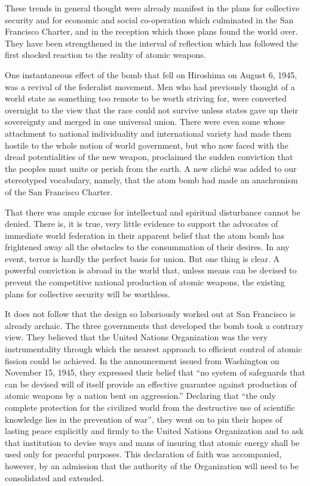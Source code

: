 These trends in general thought were already manifest in the plans for collective security and for economic and social co-operation which culminated in the San Francisco Charter, and in the reception which those plans found the world over. They have been strengthened in the interval of reflection which has followed the first shocked reaction to the reality of atomic weapons.

One instantaneous effect of the bomb that fell on Hiroshima on August 6, 1945, was a revival of the federalist movement. Men who had previously thought of a world state as something too remote to be worth striving for, were converted overnight to the view that the race could not survive unless states gave up their sovereignty and merged in one universal union. There were even some whose attachment to national individuality and international variety had made them hostile to the whole notion of world government, but who now faced with the dread potentialities of the new weapon, proclaimed the sudden conviction that the peoples must unite or perish from the earth. A new clich\'e was added to our stereotyped vocabulary, namely, that the atom bomb had made an anachronism of the San Francisco Charter.

That there was ample excuse for intellectual and spiritual disturbance cannot be denied. There is, it is true, very little evidence to support the advocates of immediate world federation in their apparent belief that the atom bomb has frightened away all the obstacles to the consummation of their desires. In any event, terror is hardly the perfect basis for union. But one thing is clear. A powerful conviction is abroad in the world that, unless means can be devised to prevent the competitive national production of atomic weapons, the existing plans for collective security will be worthless.

It does not follow that the design so laboriously worked out at San Francisco is already archaic. The three governments that developed the bomb took a contrary view. They believed that the United Nations Organization was the very instrumentality through which the nearest approach to efficient control of atomic fission could be achieved. In the announcement issued from Washington on November 15, 1945, they expressed their belief that ``no system of safeguards that can be devised will of itself provide an effective guarantee against production of atomic weapons by a nation bent on aggression.'' Declaring that ``the only complete protection for the civilized world from the destructive use of scientific knowledge lies in the prevention of war'', they went on to pin their hopes of lasting peace explicitly and firmly to the United Nations Organization and to ask that institution to devise ways and mans of insuring that atomic energy shall be used only for peaceful purposes. This declaration of faith was accompanied, however, by an admission that the authority of the Organization will need to be consolidated and extended.

